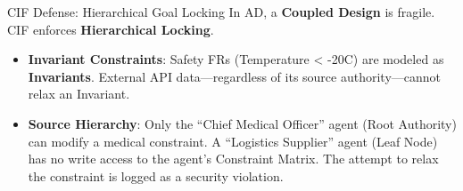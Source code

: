 \documentclass[
  ignorenonframetext,
]{beamer}
\providecommand{\tightlist}{%
  \setlength{\itemsep}{0pt}\setlength{\parskip}{0pt}}
\begin{document}
\begin{frame}{CIF Defense: Hierarchical Goal Locking}
\protect{}\label{cif-defense-hierarchical-goal-locking}
In AD, a \textbf{Coupled Design} is fragile. CIF enforces
\textbf{Hierarchical Locking}.

\begin{itemize}
\tightlist
\item
  \textbf{Invariant Constraints}: Safety FRs (Temperature \textless{}
  -20C) are modeled as \textbf{Invariants}. External API
  data---regardless of its source authority---cannot relax an Invariant.
\item
  \textbf{Source Hierarchy}: Only the ``Chief Medical Officer'' agent
  (Root Authority) can modify a medical constraint. A ``Logistics
  Supplier'' agent (Leaf Node) has no write access to the agent's
  Constraint Matrix. The attempt to relax the constraint is logged as a
  security violation.
\end{itemize}
\end{frame}
\end{document}
